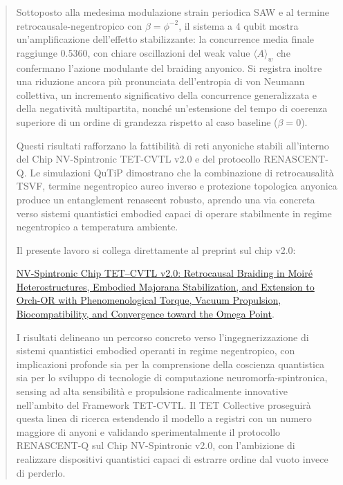 \documentclass[11pt,a4paper]{article}
\theoremstyle{plain}
\theoremstyle{definition}
\begin{document}
\begin{abstract}
Sottoposto alla medesima modulazione strain periodica SAW e al termine retrocausale-negentropico con \(\beta = \phi^{-2}\), il sistema a 4 qubit mostra un'amplificazione dell'effetto stabilizzante: la concurrence media finale raggiunge 0.5360, con chiare oscillazioni del weak value \(\langle A \rangle_w\) che confermano l'azione modulante del braiding anyonico. Si registra inoltre una riduzione ancora più pronunciata dell'entropia di von Neumann collettiva, un incremento significativo della concurrence generalizzata e della negatività multipartita, nonché un'estensione del tempo di coerenza superiore di un ordine di grandezza rispetto al caso baseline (\(\beta=0\)).

Questi risultati rafforzano la fattibilità di reti anyoniche stabili all'interno del Chip NV-Spintronic TET-CVTL v2.0 e del protocollo RENASCENT-Q. Le simulazioni QuTiP dimostrano che la combinazione di retrocausalità TSVF, termine negentropico aureo inverso e protezione topologica anyonica produce un entanglement renascent robusto, aprendo una via concreta verso sistemi quantistici embodied capaci di operare stabilmente in regime negentropico a temperatura ambiente.

Il presente lavoro si collega direttamente al preprint sul chip v2.0:

\href{https://doi.org/10.5281/zenodo.19109980}{NV-Spintronic Chip TET–CVTL v2.0: Retrocausal Braiding in Moiré Heterostructures, Embodied Majorana Stabilization, and Extension to Orch-OR with Phenomenological Torque, Vacuum Propulsion, Biocompatibility, and Convergence toward the Omega Point}.

I risultati delineano un percorso concreto verso l'ingegnerizzazione di sistemi quantistici embodied operanti in regime negentropico, con implicazioni profonde sia per la comprensione della coscienza quantistica sia per lo sviluppo di tecnologie di computazione neuromorfa-spintronica, sensing ad alta sensibilità e propulsione radicalmente innovative nell'ambito del Framework TET-CVTL. Il TET Collective proseguirà questa linea di ricerca estendendo il modello a registri con un numero maggiore di anyoni e validando sperimentalmente il protocollo RENASCENT-Q sul Chip NV-Spintronic v2.0, con l'ambizione di realizzare dispositivi quantistici capaci di estrarre ordine dal vuoto invece di perderlo.

\end{abstract}



\vspace{0.4cm}
\end{document}

